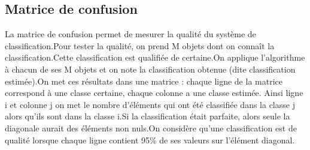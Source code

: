 \documentclass[letterpaper,10pt,english]{jupyterBook}
\begin{document}
\subsection{Matrice de confusion}
\label{\detokenize{notebooks/Machine-Learning/KNN-Cours:matrice-de-confusion}}
\sphinxAtStartPar
La matrice de confusion permet de mesurer la qualité du système de classification.Pour tester la qualité, on prend M objets dont on connaît la classification.Cette classification est qualifiée de certaine.On applique l’algorithme à chacun de ses M objets et on note la classification obtenue (dite classification estimée).On met ces résultats dans une matrice : chaque ligne de la matrice correspond à une classe certaine, chaque colonne a une classe estimée. Ainsi ligne i et colonne j on met le nombre d’éléments qui ont été classifiée dans la classe j alors qu’ils sont dans la classe i.Si la classification était parfaite, alors seule la diagonale aurait des éléments non nuls.On considère qu’une classification est de qualité lorsque chaque ligne contient 95\% de ses valeurs sur l’élément diagonal.
\begin{sphinxVerbatimInput}

\begin{sphinxVerbatim}[commandchars=\\\{\}]
 
       
        \PYG{p}{[}\PYG{p}{]}
        \PYG{p}{[}\PYG{p}{[}\PYG{p}{]}\PYG{p}{]}
\end{sphinxVerbatim}
\end{sphinxVerbatimInput}
\end{document}
